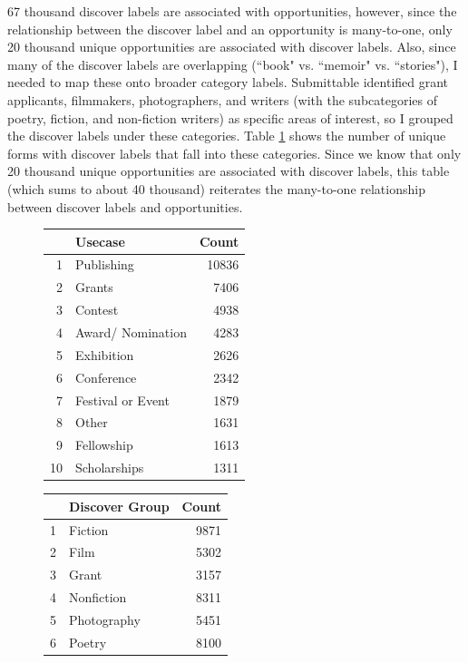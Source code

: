\documentclass[12pt]{report}   %
\begin{document}
67 thousand discover labels are associated with opportunities, however, since the relationship between the discover label and an opportunity is many-to-one, only 20 thousand unique opportunities are associated with discover labels. Also, since many of the discover labels are overlapping (``book" vs. ``memoir" vs. ``stories"), I needed to map these onto broader category labels. Submittable identified grant applicants, filmmakers, photographers, and writers (with the subcategories of poetry, fiction, and non-fiction writers) as specific areas of interest, so I grouped the discover labels under these categories. Table \ref{table:discovergroup} shows the number of unique forms with discover labels that fall into these categories. Since we know that only 20 thousand unique opportunities are associated with discover labels, this table (which sums to about 40 thousand) reiterates the many-to-one relationship between discover labels and opportunities.
\begin{figure}[h]
\begin{minipage}{0.45\textwidth}
\captionsetup{font=scriptsize}
\centering
{}
\label{table:topusecase}
\begin{tabular}{rlr}
  \hline
 & Usecase & Count \\ 
  \hline
1 & Publishing & 10836 \\ 
  2 & Grants & 7406 \\ 
  3 & Contest & 4938 \\ 
  4 & Award/ Nomination & 4283 \\ 
  5 & Exhibition & 2626 \\ 
  6 & Conference & 2342 \\ 
  7 & Festival or Event & 1879 \\ 
  8 & Other & 1631 \\ 
  9 & Fellowship & 1613 \\ 
  10 & Scholarships & 1311 \\ 
   \hline
\end{tabular}
\end{minipage}
\hfill
\begin{minipage}{0.45\textwidth}
\captionsetup{font=scriptsize}
     \centering
{}
\label{table:discovergroup}
\centering
\begin{tabular}{rlr}
  \hline
 & Discover Group & Count \\ 
  \hline
1 & Fiction & 9871 \\ 
  2 & Film & 5302 \\ 
  3 & Grant & 3157 \\ 
  4 & Nonfiction & 8311 \\ 
  5 & Photography & 5451 \\ 
  6 & Poetry & 8100 \\ 
   \hline
\end{tabular}
    \end{minipage}
\end{figure}
\end{document}
